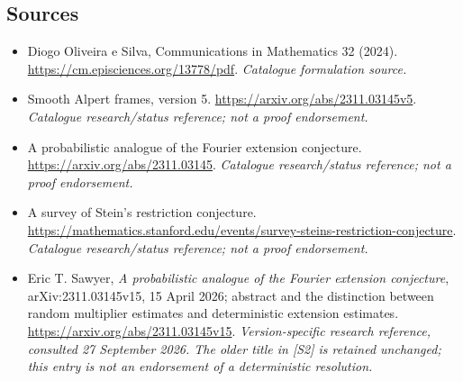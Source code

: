 \documentclass[11pt,a4paper]{article}
\numberwithin{equation}{section}
\begin{document}
\subsection{Sources}
\begin{itemize}\raggedright
\item[\textnormal{[S1]}]\hypertarget{source:statement:1}{} Diogo Oliveira e Silva, Communications in Mathematics 32 (2024).
\url{https://cm.episciences.org/13778/pdf}.
{\small\textit{Catalogue formulation source.}}
\item[\textnormal{[S2]}]\hypertarget{source:statement:2}{} Smooth Alpert frames, version 5.
\url{https://arxiv.org/abs/2311.03145v5}.
{\small\textit{Catalogue research/status reference; not a proof endorsement.}}
\item[\textnormal{[S3]}]\hypertarget{source:statement:3}{} A probabilistic analogue of the Fourier extension conjecture.
\url{https://arxiv.org/abs/2311.03145}.
{\small\textit{Catalogue research/status reference; not a proof endorsement.}}
\item[\textnormal{[S4]}]\hypertarget{source:statement:4}{} A survey of Stein's restriction conjecture.
\url{https://mathematics.stanford.edu/events/survey-steins-restriction-conjecture}.
{\small\textit{Catalogue research/status reference; not a proof endorsement.}}
\item[\textnormal{[E1]}]\hypertarget{extra:statement:1}{} Eric T. Sawyer,
\emph{A probabilistic analogue of the Fourier extension conjecture},
arXiv:2311.03145v15, 15 April 2026; abstract and the distinction between
random multiplier estimates and deterministic extension estimates.
\url{https://arxiv.org/abs/2311.03145v15}.
{\small\textit{Version-specific research reference, consulted 27 September
2026. The older title in [S2] is retained unchanged; this entry is not an
endorsement of a deterministic resolution.}}
\end{itemize}
\end{document}
